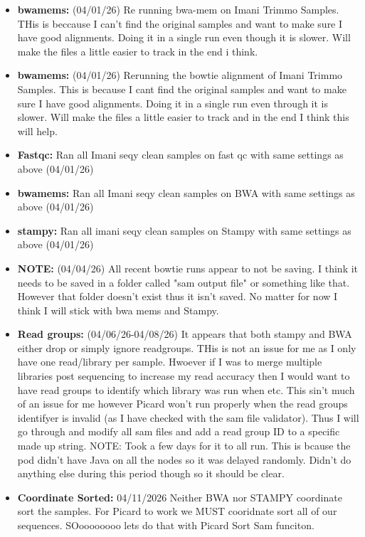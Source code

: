 \documentclass{article}
\begin{document}
\begin{itemize}
        \item \textbf{bwamems:} (04/01/26) Re running bwa-mem on Imani Trimmo Samples.   THis is beccause I can't find the original samples and want to make sure I have good alignments.   Doing it in a single run even though it is slower.   Will make the files a little easier to track in the end i think.
        
        \item \textbf{bwamems:} (04/01/26)  Rerunning the bowtie alignment of Imani Trimmo Samples. This is because I cant find the original samples and want to make sure I have good alignments. Doing it in a single run even through it is slower.   Will make the files a little easier to track and in the end I think this will help.

        \item \textbf{Fastqc:} Ran all Imani seqy clean samples on fast qc with same settings as above (04/01/26)
        \item \textbf{bwamems:} Ran all Imani seqy clean samples on BWA with same settings as above (04/01/26)
        \item \textbf{stampy:} Ran all imani seqy clean samples on Stampy with same settings as above (04/01/26)
        \item \textbf{NOTE:} (04/04/26) All recent bowtie runs appear to not be saving.   I think it needs to be saved in a folder called "sam output file" or something like that.  However that folder doesn't exist thus it isn't saved.   No matter for now I think I will stick with bwa mems and Stampy.
        \item \textbf{Read groups:} (04/06/26-04/08/26) It appears that both stampy and BWA either drop or simply ignore readgroups.   THis is not an issue for me as I only have one read/library per sample.   Hwoever if I was to merge multiple libraries post sequencing to increase my read accuracy then I would want to have read groups to identify which library was run when etc.    This sin't much of an issue for me however Picard won't run properly when the read groups identifyer is invalid (as I have checked with the sam file validator).    Thus I will go through and modify all sam files and add a read group ID to a specific made up string.  NOTE:  Took a few days for it to all run.   This is bcause the pod didn't have Java on all the nodes so it was delayed randomly.   Didn't do anything else during this period though so it should be clear.
        \item \textbf{Coordinate Sorted:} {04/11/2026}  Neither BWA nor STAMPY coordinate sort the samples.   For Picard to work we MUST cooridnate sort all of our sequences.   SOoooooooo lets do that with Picard Sort Sam funciton.

\end{itemize}
\end{document}
